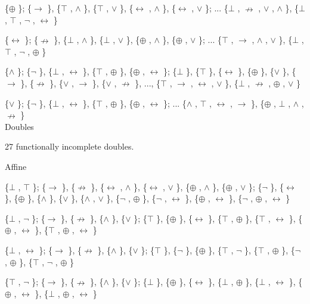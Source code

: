 \{$\oplus$ \}; \{$\to$ \}, \{$\top$ , $\land$ \}, \{$\top$ , $\lor$ \}, \{$\leftrightarrow$ , $\land$ \}, \{$\leftrightarrow$ , $\lor$ \}; ... \{$\bot$ , $\nrightarrow$ , $\lor$ ,
$\land$ \}, \{$\bot$ , $\top$ , $\neg$ , $\leftrightarrow$ \}

\{$\leftrightarrow$ \}; \{$\nrightarrow$ \}, \{$\bot$ , $\land$ \}, \{$\bot$ , $\lor$ \}, \{$\oplus$ , $\land$ \}, \{$\oplus$ , $\lor$ \}; ... \{$\top$ , $\to$ , $\land$ ,
$\lor$ \}, \{$\bot$ , $\top$ , $\neg$ , $\oplus$ \}

\{$\land$ \}; \{$\neg$ \}, \{$\bot$ , $\leftrightarrow$ \}, \{$\top$ , $\oplus$ \}, \{$\oplus$ , $\leftrightarrow$ \}; \{$\bot$ \}, \{$\top$ \}, \{$\leftrightarrow$ \}, \{$\oplus$ \},
\{$\lor$ \}, \{$\to$ \}, \{$\nrightarrow$ \}, \{$\lor$ , $\to$ \}, \{$\lor$ , $\nrightarrow$ \}, ..., \{$\top$ , $\to$ , $\leftrightarrow$ , $\lor$ \}, \{$\bot$ , $\nrightarrow$ , $\oplus$ ,
$\lor$ \}

\{$\lor$ \}; \{$\neg$ \}, \{$\bot$ , $\leftrightarrow$ \}, \{$\top$ , $\oplus$ \}, \{$\oplus$ , $\leftrightarrow$ \}; ... \{$\land$ , $\top$ , $\leftrightarrow$ , $\to$ \}, \{$\oplus$ , $\bot$ ,
$\land$ , $\nrightarrow$ \}\\

\protect\hypertarget{anchor-8}{}{}Doubles

27 functionally incomplete doubles.

\protect\hypertarget{anchor-9}{}{}Affine

\{$\bot$ , $\top$ \}; \{$\to$ \}, \{$\nrightarrow$ \}, \{$\leftrightarrow$ , $\land$ \}, \{$\leftrightarrow$ , $\lor$ \}, \{$\oplus$ , $\land$ \}, \{$\oplus$ , $\lor$ \}; \{$\neg$ \},
\{$\leftrightarrow$ \}, \{$\oplus$ \}, \{$\land$ \}, \{$\lor$ \}, \{$\land$ , $\lor$ \}, \{$\neg$ , $\oplus$ \}, \{$\neg$ , $\leftrightarrow$ \}, \{$\oplus$ , $\leftrightarrow$ \}, \{$\neg$ ,
$\oplus$ , $\leftrightarrow$ \}

\{$\bot$ , $\neg$ \}; \{$\to$ \}, \{$\nrightarrow$ \}, \{$\land$ \}, \{$\lor$ \}; \{$\top$ \}, \{$\oplus$ \}, \{$\leftrightarrow$ \}, \{$\top$ , $\oplus$ \},
\{$\top$ , $\leftrightarrow$ \}, \{$\oplus$ , $\leftrightarrow$ \}, \{$\top$ , $\oplus$ , $\leftrightarrow$ \}

\{$\bot$ , $\leftrightarrow$ \}; \{$\to$ \}, \{$\nrightarrow$ \}, \{$\land$ \}, \{$\lor$ \}; \{$\top$ \}, \{$\neg$ \}, \{$\oplus$ \}, \{$\top$ , $\neg$ \},
\{$\top$ , $\oplus$ \}, \{$\neg$ , $\oplus$ \}, \{$\top$ , $\neg$ , $\oplus$ \}

\{$\top$ , $\neg$ \}; \{$\to$ \}, \{$\nrightarrow$ \}, \{$\land$ \}, \{$\lor$ \}; \{$\bot$ \}, \{$\oplus$ \}, \{$\leftrightarrow$ \}, \{$\bot$ , $\oplus$ \},
\{$\bot$ , $\leftrightarrow$ \}, \{$\oplus$ , $\leftrightarrow$ \}, \{$\bot$ , $\oplus$ , $\leftrightarrow$ \}

